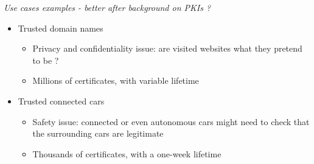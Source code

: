 %
%





\begin{frame}
\emph{Use cases examples - better after background on PKIs ?}

\begin{itemize}
\item Trusted domain names
\begin{itemize}
\item Privacy and confidentiality issue: are visited websites what they pretend to be ?
\item Millions of certificates, with variable lifetime
\end{itemize}
\item Trusted connected cars
\begin{itemize}
\item Safety issue: connected or even autonomous cars might need to check that the surrounding cars are legitimate
\item Thousands of certificates, with a one-week lifetime
\end{itemize}
\end{itemize}


\end{frame}